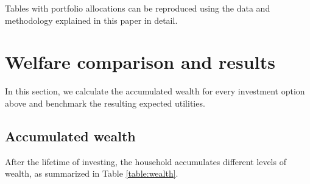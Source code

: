 \documentclass[]{elsarticle}
\begin{document}
Tables with portfolio allocations can be reproduced using the data and methodology explained in this paper in detail.

\section{Welfare comparison and results}
\label{welfare}

In this section, we calculate the accumulated wealth for every investment option above and benchmark the resulting expected utilities.

\subsection{Accumulated wealth}

After the lifetime of investing, the household accumulates different levels of wealth, as summarized in Table \ref{table:wealth}.
\end{document}

